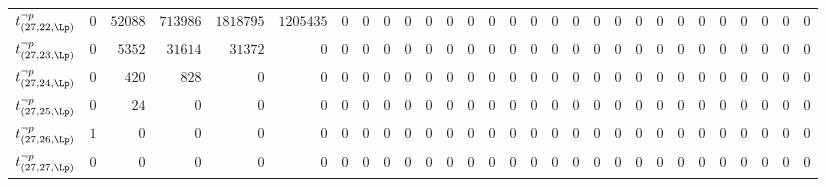 \begin{tabular}{r|rrrrrrrrrrrrrrrrrrrrrrrrrrrr}
  $t^{\neg p}_{(27,22,\Lp)}$ & $0$ & $52088$ & $713986$ & $1818795$ & $1205435$ & $0$ & $0$ & $0$ & $0$ & $0$ & $0$ & $0$ & $0$ & $0$ & $0$ & $0$ & $0$ & $0$ & $0$ & $0$ & $0$ & $0$ & $0$ & $0$ & $0$ & $0$ & $0$ & $0$ \\
  $t^{\neg p}_{(27,23,\Lp)}$ & $0$ & $5352$ & $31614$ & $31372$ & $0$ & $0$ & $0$ & $0$ & $0$ & $0$ & $0$ & $0$ & $0$ & $0$ & $0$ & $0$ & $0$ & $0$ & $0$ & $0$ & $0$ & $0$ & $0$ & $0$ & $0$ & $0$ & $0$ & $0$ \\
  $t^{\neg p}_{(27,24,\Lp)}$ & $0$ & $420$ & $828$ & $0$ & $0$ & $0$ & $0$ & $0$ & $0$ & $0$ & $0$ & $0$ & $0$ & $0$ & $0$ & $0$ & $0$ & $0$ & $0$ & $0$ & $0$ & $0$ & $0$ & $0$ & $0$ & $0$ & $0$ & $0$ \\
  $t^{\neg p}_{(27,25,\Lp)}$ & $0$ & $24$ & $0$ & $0$ & $0$ & $0$ & $0$ & $0$ & $0$ & $0$ & $0$ & $0$ & $0$ & $0$ & $0$ & $0$ & $0$ & $0$ & $0$ & $0$ & $0$ & $0$ & $0$ & $0$ & $0$ & $0$ & $0$ & $0$ \\
  $t^{\neg p}_{(27,26,\Lp)}$ & $1$ & $0$ & $0$ & $0$ & $0$ & $0$ & $0$ & $0$ & $0$ & $0$ & $0$ & $0$ & $0$ & $0$ & $0$ & $0$ & $0$ & $0$ & $0$ & $0$ & $0$ & $0$ & $0$ & $0$ & $0$ & $0$ & $0$ & $0$ \\
  $t^{\neg p}_{(27,27,\Lp)}$ & $0$ & $0$ & $0$ & $0$ & $0$ & $0$ & $0$ & $0$ & $0$ & $0$ & $0$ & $0$ & $0$ & $0$ & $0$ & $0$ & $0$ & $0$ & $0$ & $0$ & $0$ & $0$ & $0$ & $0$ & $0$ & $0$ & $0$ & $0$ \\
\end{tabular}
